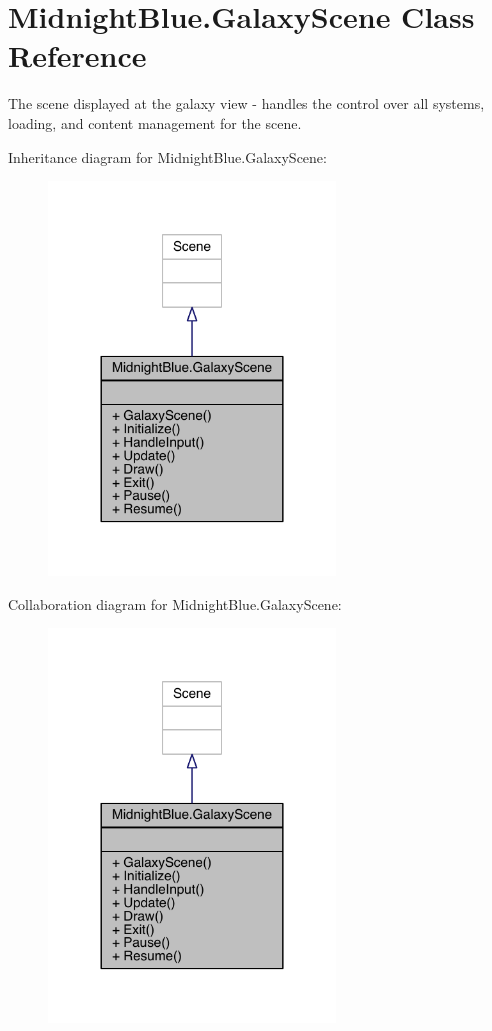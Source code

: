 \hypertarget{class_midnight_blue_1_1_galaxy_scene}{}\section{Midnight\+Blue.\+Galaxy\+Scene Class Reference}
\label{class_midnight_blue_1_1_galaxy_scene}


The scene displayed at the galaxy view -\/ handles the control over all systems, loading, and content management for the scene.  




Inheritance diagram for Midnight\+Blue.\+Galaxy\+Scene\+:
\nopagebreak
\begin{figure}[H]
\begin{center}
\leavevmode
\includegraphics[width=216pt]{class_midnight_blue_1_1_galaxy_scene__inherit__graph}
\end{center}
\end{figure}


Collaboration diagram for Midnight\+Blue.\+Galaxy\+Scene\+:
\nopagebreak
\begin{figure}[H]
\begin{center}
\leavevmode
\includegraphics[width=216pt]{class_midnight_blue_1_1_galaxy_scene__coll__graph}
\end{center}
\end{figure}
